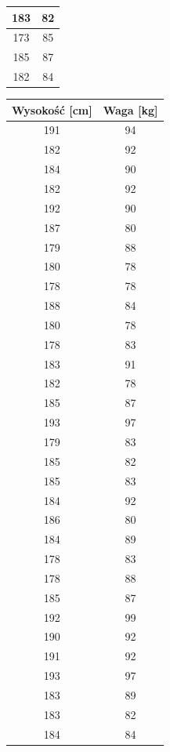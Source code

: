 \documentclass[12pt]{mwart}
\begin{document}
\begin{table}[H]
\begin{multicols}{2}
\begin{table}[H]
\begin{tabular}{|c|c|}
				183 & 82 \\ \hline
				173 & 85 \\ \hline
				185 & 87 \\ \hline
				182 & 84 \\ \hline
			\end{tabular}
		\end{table}
		\columnbreak
		\begin{table}[H]
			\centering
			\begin{tabular}{|c|c|}
				\hline
				\textbf{Wysokość [cm]} & \textbf{Waga [kg]} \\ \hline
				191 & 94 \\ \hline
				182 & 92 \\ \hline
				184 & 90 \\ \hline
				182 & 92 \\ \hline
				192 & 90 \\ \hline
				187 & 80 \\ \hline
				179 & 88 \\ \hline
				180 & 78 \\ \hline
				178 & 78 \\ \hline
				188 & 84 \\ \hline
				180 & 78 \\ \hline
				178 & 83 \\ \hline
				183 & 91 \\ \hline
				182 & 78 \\ \hline
				185 & 87 \\ \hline
				193 & 97 \\ \hline
				179 & 83 \\ \hline
				185 & 82 \\ \hline
				185 & 83 \\ \hline
				184 & 92 \\ \hline
				186 & 80 \\ \hline
				184 & 89 \\ \hline
				178 & 83 \\ \hline
				178 & 88 \\ \hline
				185 & 87 \\ \hline
				192 & 99 \\ \hline
				190 & 92 \\ \hline
				191 & 92 \\ \hline
				193 & 97 \\ \hline
				183 & 89 \\ \hline
				183 & 82 \\ \hline
				184 & 84 \\ \hline

\end{tabular}
\end{table}
\end{multicols}
\end{table}
\end{document}
